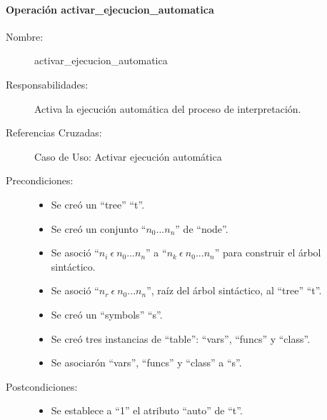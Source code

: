\paragraph{Operación activar\_ejecucion\_automatica}
\FloatBarrier
\begin{framed}
	\begin{description}
		\item [Nombre:] activar\_ejecucion\_automatica
		\item [Responsabilidades:] Activa la ejecución automática del proceso de interpretación.
		\item [Referencias Cruzadas: ] Caso de Uso: Activar ejecución automática
      \item [Precondiciones:] \hfill
         \begin {itemize}
         \item Se creó un ``tree'' ``t''.
         \item Se creó un conjunto ``$n_0...n_n$'' de ``node''.
         \item Se asoció ``$n_i\ \epsilon\ n_0...n_n$'' a ``$n_k\ \epsilon\ n_0...n_n$'' para construir el árbol sintáctico.
         \item Se asoció  ``$n_r\ \epsilon\ n_0...n_n$'', raíz del árbol sintáctico, al ``tree'' ``t''.
         \item Se creó un ``symbols'' ``s''.
         \item Se creó tres instancias de ``table'': ``vars'', ``funcs'' y ``class''.
         \item Se asociarón ``vars'', ``funcs'' y ``class'' a ``s''.
      \end{itemize}
      \item [Postcondiciones:] \hfill
      \begin {itemize}
         \item Se establece a ``1'' el atributo ``auto'' de ``t''.
      \end{itemize}
	\end{description} 
\end{framed}
\FloatBarrier

